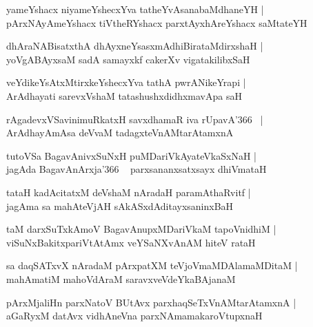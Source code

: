 \documentclass[twoside,12pt,openright]{book}
\newcounter{shloka}[chapter]
\begin{document}
\begin{shloka}%
yameYshacx niyameYshecxYva tatheYvAsanabaMdhaneYH |\\
pArxNAyAmeYshacx tiVtheRYshacx parxtAyxhAreYshacx saMtateYH 
\end{shloka}

\begin{shloka}%
dhAraNABisatxthA dhAyxneYsasxmAdhiBirataMdirxshaH |\\
yoVgABAyxsaM sadA samayxkf cakerXv vigatakilibxSaH 
\end{shloka}

\begin{shloka}%
veYdikeYsAtxMtirxkeYshecxYva tathA pwrANikeYrapi |\\
ArAdhayati sarevxVshaM tatashushxdidhxmavApa saH 
\end{shloka}

\begin{shloka}%
rAgadevxVSavinimuRkatxH savxdhamaR iva rUpavA\char'366 ~|\\
ArAdhayAmAsa deVvaM tadagxteVnAMtarAtamxnA 
\end{shloka}

\begin{shloka}%
tutoVSa BagavAnivxSuNxH puMDariVkAyateVkaSxNaH |\\
jagAda BagavAnArxja\char'366 ~ parxsananxsatxsayx dhiVmataH 
\end{shloka}

\begin{shloka}%
tataH kadAcitatxM deVshaM nAradaH paramAthaRvitf |\\
jagAma sa mahAteVjAH sAkASxdAditayxsaninxBaH 
\end{shloka}

\begin{shloka}%
taM darxSuTxkAmoV BagavAnupxMDariVkaM tapoVnidhiM |\\
viSuNxBakitxpariVtAtAmx veYSaNXvAnAM hiteV rataH 
\end{shloka}

\begin{shloka}%
sa daqSATxvX nAradaM pArxpatXM teVjoVmaMDAlamaMDitaM |\\
mahAmatiM mahoVdAraM saravxveVdeYkaBAjanaM 
\end{shloka}

\begin{shloka}%
pArxMjaliHn parxNatoV BUtAvx parxhaqSeTxVnAMtarAtamxnA |\\
aGaRyxM datAvx vidhAneVna parxNAmamakaroVtupxnaH 
\end{shloka}
\end{document}

